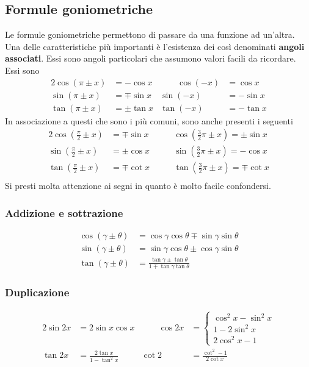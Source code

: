 \subsection{Formule goniometriche}
Le formule goniometriche permettono di passare da una funzione ad un'altra. Una delle caratteristiche 
più importanti è l'esistenza dei così denominati \textbf{angoli associati}. Essi sono angoli 
particolari che assumono valori facili da ricordare. Essi sono
\begin{alignat*}{2}
  \cos(\pi\pm x) & = -\cos x &\qquad \cos(-x) &= \cos x\\
  \sin(\pi\pm x) &= \mp\sin x & \sin(-x) &= -\sin x\\
  \tan(\pi\pm x) &= \pm\tan x & \tan(-x) &= -\tan x
\end{alignat*}
In associazione a questi che sono i più comuni, sono anche presenti i seguenti
\begin{alignat*}{2}
  \cos\left(\frac{\pi}{2}\pm x\right) &= \mp\sin x &\qquad \cos\left(\frac{3}{2}\pi\pm x\right) = 
  \pm\sin x\\
  \sin\left(\frac{\pi}{2}\pm x\right) &= \pm\cos x &\qquad \sin\left(\frac{3}{2}\pi\pm x\right) = 
  -\cos x\\
  \tan\left(\frac{\pi}{2}\pm x\right) &= \mp\cot x &\qquad \tan\left(\frac{3}{2}\pi\pm x\right) = 
  \mp\cot x\\
\end{alignat*}
Si presti molta attenzione ai segni in quanto è molto facile confondersi.

\subsubsection{Addizione e sottrazione}
\begin{align*}
  \cos(\gamma\pm\theta) &= \cos\gamma\cos\theta\mp\sin\gamma\sin\theta\\
  \sin(\gamma\pm\theta) &= \sin\gamma\cos\theta\pm\cos\gamma\sin\theta\\
  \tan(\gamma\pm\theta) &= \frac{\tan\gamma\pm\tan\theta}{1\mp\tan\gamma\tan\theta}
\end{align*}

\subsubsection{Duplicazione}
\begin{alignat*}{2}
  \sin2x & =2\sin x\cos x &\qquad \cos2x &= \begin{cases}
    \cos^2x - \sin^2x\\
    1-2\sin^2x\\
    2\cos^2x-1
  \end{cases}\\
  \tan2x &= \frac{2\tan x}{1-\tan^2x} & \cot2 &= \frac{\cot^2-1}{2\cot x}
\end{alignat*}

